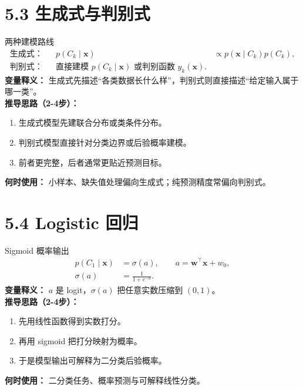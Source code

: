 ﻿\documentclass[11pt]{article}
\begin{document}
\section{5.3 生成式与判别式}
\begin{formulabox}{两种建模路线}
\begin{align}
\text{生成式：}
&&p(C_k\mid \mathbf x) &\propto p(\mathbf x\mid C_k)p(C_k),\\
\text{判别式：}
&&\text{直接建模 } p(C_k\mid \mathbf x) \text{ 或判别函数 } y_k(\mathbf x).
\end{align}
\textbf{变量释义：} 生成式先描述“各类数据长什么样”，判别式则直接描述“给定输入属于哪一类”。\\
\textbf{推导思路（2-4步）：}
\begin{enumerate}[leftmargin=1.6em]
  \item 生成式模型先建联合分布或类条件分布。
  \item 判别式模型直接针对分类边界或后验概率建模。
  \item 前者更完整，后者通常更贴近预测目标。
\end{enumerate}
\textbf{何时使用：} 小样本、缺失值处理偏向生成式；纯预测精度常偏向判别式。
\end{formulabox}

\section{5.4 Logistic 回归}
\begin{formulabox}{Sigmoid 概率输出}
\begin{align}
p(C_1\mid \mathbf x)&=\sigma(a),
\qquad a=\mathbf w^\top\mathbf x+w_0,\\
\sigma(a)&=\frac{1}{1+e^{-a}}.
\end{align}
\textbf{变量释义：} $a$ 是 logit，$\sigma(a)$ 把任意实数压缩到 $(0,1)$。\\
\textbf{推导思路（2-4步）：}
\begin{enumerate}[leftmargin=1.6em]
  \item 先用线性函数得到实数打分。
  \item 再用 sigmoid 把打分映射为概率。
  \item 于是模型输出可解释为二分类后验概率。
\end{enumerate}
\textbf{何时使用：} 二分类任务、概率预测与可解释线性分类。
\end{formulabox}
\end{document}
